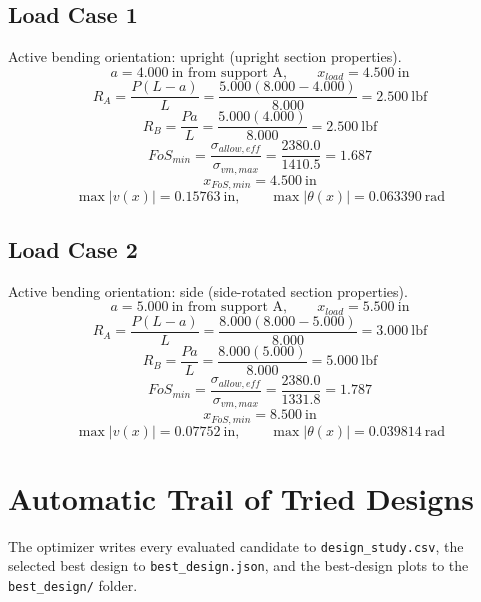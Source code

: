 \documentclass[11pt]{article}
\begin{document}
\subsection*{Load Case 1}
Active bending orientation: upright (upright section properties).
\[a = 4.000\ \mathrm{in} \text{ from support A}, \qquad x_{load} = 4.500\ \mathrm{in}\]
\[R_A = \frac{P(L-a)}{L} = \frac{5.000(8.000-4.000)}{8.000} = 2.500\ \mathrm{lbf}\]
\[R_B = \frac{Pa}{L} = \frac{5.000(4.000)}{8.000} = 2.500\ \mathrm{lbf}\]
\[FoS_{min} = \frac{\sigma_{allow,eff}}{\sigma_{vm,max}} = \frac{2380.0}{1410.5} = 1.687\]
\[x_{FoS,min} = 4.500\ \mathrm{in}\]
\[\max |v(x)| = 0.15763\ \mathrm{in}, \qquad \max |\theta(x)| = 0.063390\ \mathrm{rad}\]
\subsection*{Load Case 2}
Active bending orientation: side (side-rotated section properties).
\[a = 5.000\ \mathrm{in} \text{ from support A}, \qquad x_{load} = 5.500\ \mathrm{in}\]
\[R_A = \frac{P(L-a)}{L} = \frac{8.000(8.000-5.000)}{8.000} = 3.000\ \mathrm{lbf}\]
\[R_B = \frac{Pa}{L} = \frac{8.000(5.000)}{8.000} = 5.000\ \mathrm{lbf}\]
\[FoS_{min} = \frac{\sigma_{allow,eff}}{\sigma_{vm,max}} = \frac{2380.0}{1331.8} = 1.787\]
\[x_{FoS,min} = 8.500\ \mathrm{in}\]
\[\max |v(x)| = 0.07752\ \mathrm{in}, \qquad \max |\theta(x)| = 0.039814\ \mathrm{rad}\]

\section*{Automatic Trail of Tried Designs}
The optimizer writes every evaluated candidate to \texttt{design\_study.csv}, the selected best design to \texttt{best\_design.json}, and the best-design plots to the \texttt{best\_design/} folder.
\end{document}

